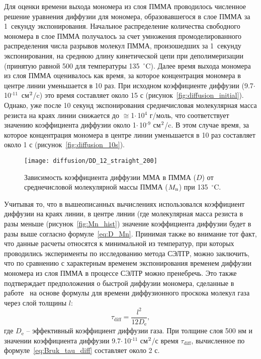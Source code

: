 Для оценки времени выхода мономера из слоя ПММА проводилось численное решение уравнения диффузии для мономера, образовавшегося в слое ПММА за 1~секунду экспонирования. Начальное распределение количества свободного мономера в слое ПММА получалось за счет умножения промоделированного распределения числа разрывов молекул ПММА, произошедших за 1~секунду экспонирования, на среднюю длину кинетической цепи при деполимеризации (принятую равной 500 для температуры 135~$^\circ$C). Далее время выхода мономера из слоя ПММА оценивалось как время, за которое концентрация мономера в центре линии уменьшается в 10 раз.
При исходном коэффициенте диффузии (9.7\:$\cdot$\,10$^\text{-11}$~см$^\text{2}$/c) это время составляет около 15 с (рисунок~\ref{fig:diffusion_initial}). Однако, уже после 10 секунд экспонирования среднечисловая молекулярная масса резиста на краях линии снижается до $\cong$1\:$\cdot$\,10$^\text{4}$ г/моль, что соответствует значению коэффициента диффузии около 1\:$\cdot$\,10$^\text{-9}$ см$^\text{2}$/c. В этом случае время, за которое концентрация мономера в центре линии уменьшается в 10 раз составляет около 1 с (рисунок~\ref{fig:diffusion_10s}).

\begin{figure}[h]
	\begin{center}
		\texttt{[image: diffusion/DD\_12\_straight\_200]}
	\end{center}
	\vspace{-1em}
	\caption{Зависимость коэффициента диффузии ММА в ПММА ($D$) от среднечисловой молекулярной массы ПММА ($M_\mathrm{n}$) при 135~$^\circ$C.}
	\label{fig:Mn_diff}
\end{figure}

Учитывая то, что в вышеописанных вычислениях использовался коэффициент диффузии на краях линии, в центре линии (где молекулярная масса резиста в разы меньше (рисунок~\ref{fig:Mn_hist}) значение коэффициента диффузии будет в разы выше согласно формуле~\ref{eq:D_Mn}. Принимая также во внимание тот факт, что данные расчеты относятся к минимальной из температур, при которых проводились эксперименты по исследованию метода СЭЛТР, можно заключить, что по сравнению с характерным временем экспонирования временем диффузии мономера из слоя ПММА в процессе СЭЛТР можно пренебречь. Это также подтверждает предположения о быстрой диффузии мономера, сделанные в работе~\cite{Bruk_2013} на основе формулы для времени диффузионного проскока молекул газа через слой толщины $l$:
\begin{equation} \label{eq:Bruk_tau_diff}
	\tau_{\text{diff}} = \frac{l^2}{12 D_\mathrm{e}},
\end{equation}
где $D_\mathrm{e}$ -- эффективный коэффициент диффузии газа. При толщине слоя 500 нм и значении коэффициента диффузии 9.7\:$\cdot$\,10$^\text{-11}$ см$^\text{2}$/с время $\tau_{\text{diff}}$, вычисленное по формуле~\ref{eq:Bruk_tau_diff} составляет около 2 с.

